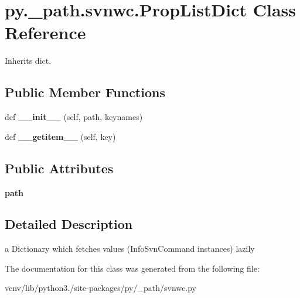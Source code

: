 \hypertarget{classpy_1_1__path_1_1svnwc_1_1_prop_list_dict}{}\section{py.\+\_\+path.\+svnwc.\+Prop\+List\+Dict Class Reference}
\label{classpy_1_1__path_1_1svnwc_1_1_prop_list_dict}


Inherits dict.

\subsection*{Public Member Functions}
\begin{DoxyCompactItemize}
\item 
\mbox{\label{classpy_1_1__path_1_1svnwc_1_1_prop_list_dict_a657ab40610abed069c854ef40a7fdcd3}} 
def {\bfseries \+\_\+\+\_\+init\+\_\+\+\_\+} (self, path, keynames)
\item 
\mbox{\label{classpy_1_1__path_1_1svnwc_1_1_prop_list_dict_a7d87dafde50fbe3e28da1aff09f6bae6}} 
def {\bfseries \+\_\+\+\_\+getitem\+\_\+\+\_\+} (self, key)
\end{DoxyCompactItemize}
\subsection*{Public Attributes}
\begin{DoxyCompactItemize}
\item 
\mbox{\label{classpy_1_1__path_1_1svnwc_1_1_prop_list_dict_aa90023433c4b70eca342821e01359ae8}} 
{\bfseries path}
\end{DoxyCompactItemize}


\subsection{Detailed Description}
\begin{DoxyVerb}a Dictionary which fetches values (InfoSvnCommand instances) lazily\end{DoxyVerb}
 

The documentation for this class was generated from the following file\+:\begin{DoxyCompactItemize}
\item 
venv/lib/python3./site-\/packages/py/\+\_\+path/svnwc.\+py\end{DoxyCompactItemize}
